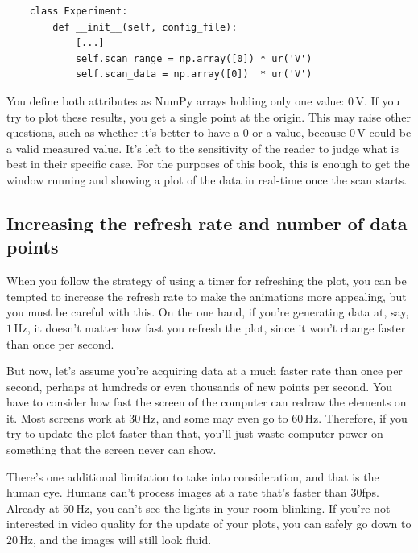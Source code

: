 \begin{verbatim}
    class Experiment:
        def __init__(self, config_file):
            [...]
            self.scan_range = np.array([0]) * ur('V')
            self.scan_data = np.array([0])  * ur('V')
\end{verbatim}

You define both attributes as NumPy arrays holding only one value: $0\,\textrm{V}$. If you try to plot these results, you get a single point at the origin. This may raise other questions, such as whether it's better to have a $0$ or a  value, because $0\,\textrm{V}$ could be a valid measured value. It's left to the sensitivity of the reader to judge what is best in their specific case. For the purposes of this book, this is enough to get the window running and showing a plot of the data in real-time once the scan starts.


\subsection{Increasing the refresh rate and number of data points}\label{subsec:refresh-rate-and-number-of-data-points}
When you follow the strategy of using a timer for refreshing the plot, you can be tempted to increase the refresh rate to make the animations more appealing, but you must be careful with this. On the one hand, if you're generating data at, say, $1\,\textrm{Hz}$, it doesn't matter how fast you refresh the plot, since it won't change faster than once per second.

But now, let's assume you're acquiring data at a much faster rate than once per second, perhaps at hundreds or even thousands of new points per second. You have to consider how fast the screen of the computer can redraw the elements on it. Most screens work at $30\,\textrm{Hz}$, and some may even go to $60\,\textrm{Hz}$. Therefore, if you try to update the plot faster than that, you'll just waste computer power on something that the screen never can show.

There's one additional limitation to take into consideration, and that is the human eye. Humans can't process images at a rate that's faster than 30fps. Already at $50\,\textrm{Hz}$, you can't see the lights in your room blinking. If you're not interested in video quality for the update of your plots, you can safely go down to $20\,\textrm{Hz}$, and the images will still look fluid.

